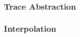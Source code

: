 \begin{frame}[t]
	\frametitle{Trace Abstraction}
	\begin{center}
		\resizebox{0.8\textwidth}{!}{}
	\end{center}
\end{frame}

\begin{frame}[t]
	\frametitle{Interpolation}
\end{frame}